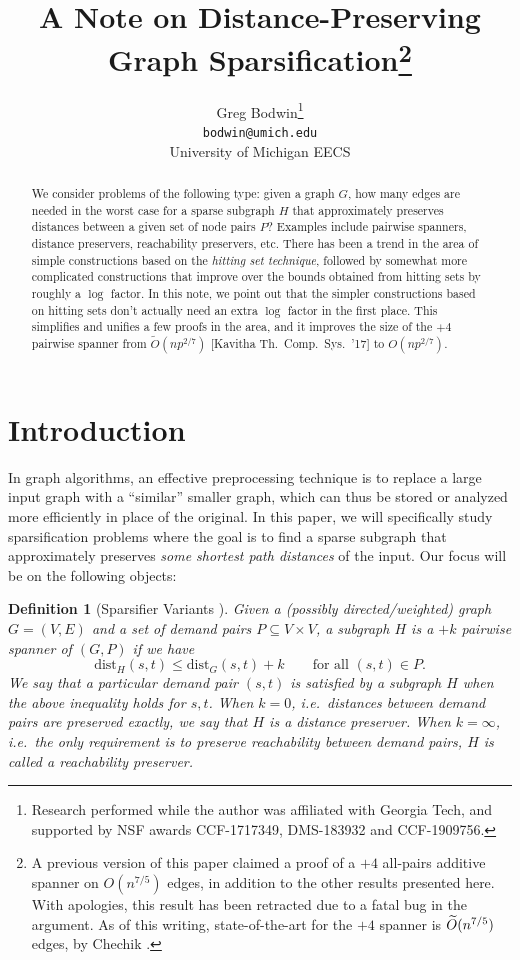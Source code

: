 \documentclass{article}
\title{A Note on Distance-Preserving Graph Sparsification\footnote{A previous version of this paper claimed a proof of a $+4$ all-pairs additive spanner on $O(n^{7/5})$ edges, in addition to the other results presented here.  With apologies, this result has been retracted due to a fatal bug in the argument.  As of this writing, state-of-the-art for the $+4$ spanner is $\Oish(n^{7/5})$ edges, by Chechik \cite{Chechik13soda}.}}
\author{Greg Bodwin\footnote{Research performed while the author was affiliated with Georgia Tech, and supported by NSF awards CCF-1717349, DMS-183932 and CCF-1909756.}\\ \texttt{bodwin@umich.edu}\\ University of Michigan EECS}
\date{}
\newtheorem{definition}{Definition}
\newcommand{\dist}{\text{dist}}
\newcommand{\Oish}{\widetilde{O}}
\begin{document}
%


\maketitle

\thispagestyle{empty}

\begin{abstract}
We consider problems of the following type: given a graph $G$, how many edges are needed in the worst case for a sparse subgraph $H$ that approximately preserves distances between a given set of node pairs $P$?
Examples include pairwise spanners, distance preservers, reachability preservers, etc.
There has been a trend in the area of simple constructions based on the \emph{hitting set technique}, followed by somewhat more complicated constructions that improve over the bounds obtained from hitting sets by roughly a $\log$ factor.
In this note, we point out that the simpler constructions based on hitting sets don't actually need an extra $\log$ factor in the first place.
This simplifies and unifies a few proofs in the area, and it improves the size of the $+4$ pairwise spanner from $\Oish(np^{2/7})$ [Kavitha Th.\ Comp.\ Sys.\ '17] to $O(np^{2/7})$.
\end{abstract}

\pagebreak


\section{Introduction}

In graph algorithms, an effective preprocessing technique is to replace a large input graph with a ``similar'' smaller graph, which can thus be stored or analyzed more efficiently in place of the original.
In this paper, we will specifically study sparsification problems where the goal is to find a sparse subgraph that approximately preserves \emph{some shortest path distances} of the input.
Our focus will be on the following objects:
\begin{definition} [Sparsifier Variants \cite{PU89jacm, LS91, CE06, CGK13, AB18}] \label{def:allspans}
Given a (possibly directed/weighted) graph $G = (V, E)$ and a set of demand pairs $P \subseteq V \times V$, a subgraph $H$ is a \emph{$+k$ pairwise spanner} of $(G, P)$ if we have
$$\dist_H(s, t) \le \dist_G(s, t) + k \qquad \text{for all } (s, t) \in P.$$
We say that a particular demand pair $(s, t)$ is \emph{satisfied} by a subgraph $H$ when the above inequality holds for $s, t$.
When $k=0$, i.e.\ distances between demand pairs are preserved exactly, we say that $H$ is a \emph{distance preserver}.
When $k=\infty$, i.e.\ the only requirement is to preserve reachability between demand pairs, $H$ is called a \emph{reachability preserver}.
\end{definition}
\end{document}
